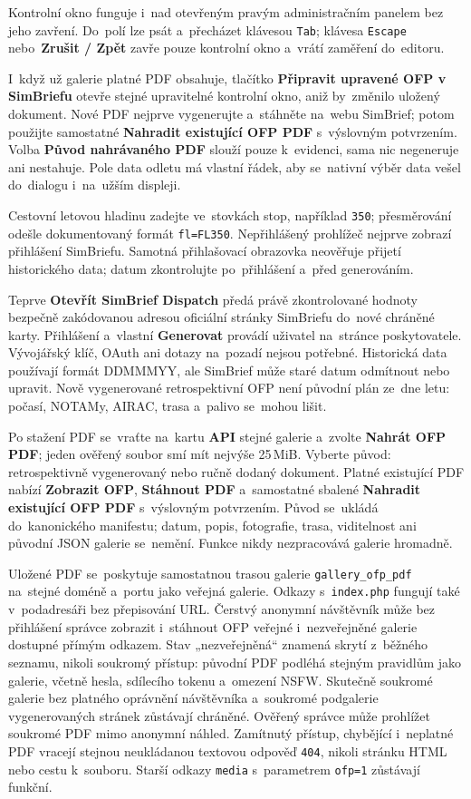 \documentclass[11pt,a4paper]{article}
\newcommand{\ui}[1]{\textbf{#1}}
\newcommand{\codeword}[1]{\nolinkurl{#1}}
\begin{document}
Kontrolní okno funguje i~nad otevřeným pravým administračním panelem bez jeho
zavření. Do~polí lze psát a~přecházet klávesou \codeword{Tab}; klávesa
\codeword{Escape} nebo~\ui{Zrušit / Zpět} zavře pouze kontrolní okno a~vrátí
zaměření do~editoru.

I~když už galerie platné PDF obsahuje, tlačítko \ui{Připravit upravené OFP v
SimBriefu} otevře stejné upravitelné kontrolní okno, aniž by~změnilo uložený
dokument. Nové PDF nejprve vygenerujte a~stáhněte na~webu SimBrief; potom
použijte samostatné \ui{Nahradit existující OFP PDF} s~výslovným potvrzením.
Volba \ui{Původ nahrávaného PDF} slouží pouze k~evidenci, sama nic negeneruje
ani nestahuje. Pole data odletu má vlastní řádek, aby se~nativní výběr data
vešel do~dialogu i~na~užším displeji.

Cestovní letovou hladinu zadejte ve~stovkách stop, například \codeword{350};
přesměrování odešle dokumentovaný formát \codeword{fl=FL350}. Nepřihlášený
prohlížeč nejprve zobrazí přihlášení SimBriefu. Samotná přihlašovací obrazovka
neověřuje přijetí historického data; datum zkontrolujte po~přihlášení a~před
generováním.

Teprve \ui{Otevřít SimBrief Dispatch} předá právě zkontrolované hodnoty bezpečně
zakódovanou adresou oficiální stránky SimBriefu do~nové chráněné karty.
Přihlášení a~vlastní \ui{Generovat} provádí uživatel na~stránce poskytovatele.
Vývojářský klíč, OAuth ani dotazy na~pozadí nejsou potřebné. Historická data
používají formát DDMMMYY, ale SimBrief může staré datum odmítnout nebo upravit.
Nově vygenerované retrospektivní OFP není původní plán ze~dne letu: počasí,
NOTAMy, AIRAC, trasa a~palivo se~mohou lišit.

Po stažení PDF se~vraťte na~kartu \ui{API} stejné galerie a~zvolte \ui{Nahrát
OFP PDF}; jeden ověřený soubor smí mít nejvýše 25\,MiB. Vyberte původ:
retrospektivně vygenerovaný nebo ručně dodaný dokument. Platné existující PDF
nabízí \ui{Zobrazit OFP}, \ui{Stáhnout PDF} a~samostatné sbalené \ui{Nahradit
existující OFP PDF} s~výslovným potvrzením. Původ se~ukládá do~kanonického
manifestu; datum, popis, fotografie, trasa, viditelnost ani původní JSON galerie
se~nemění. Funkce nikdy nezpracovává galerie hromadně.

Uložené PDF se~poskytuje samostatnou trasou galerie \codeword{gallery\_ofp\_pdf}
na~stejné doméně a~portu jako veřejná galerie. Odkazy s~\codeword{index.php}
fungují také v~podadresáři bez přepisování URL. Čerstvý anonymní návštěvník může
bez přihlášení správce zobrazit i~stáhnout OFP veřejné i~nezveřejněné galerie
dostupné přímým odkazem. Stav „nezveřejněná“ znamená skrytí z~běžného seznamu,
nikoli soukromý přístup: původní PDF podléhá stejným pravidlům jako galerie,
včetně hesla, sdílecího tokenu a~omezení NSFW. Skutečně soukromé galerie bez
platného oprávnění návštěvníka a~soukromé podgalerie vygenerovaných stránek
zůstávají chráněné. Ověřený správce může prohlížet soukromé PDF mimo anonymní
náhled. Zamítnutý přístup, chybějící i~neplatné PDF vracejí stejnou neukládanou
textovou odpověď \codeword{404}, nikoli stránku HTML nebo cestu k~souboru.
Starší odkazy \codeword{media} s~parametrem \codeword{ofp=1} zůstávají funkční.
\end{document}
